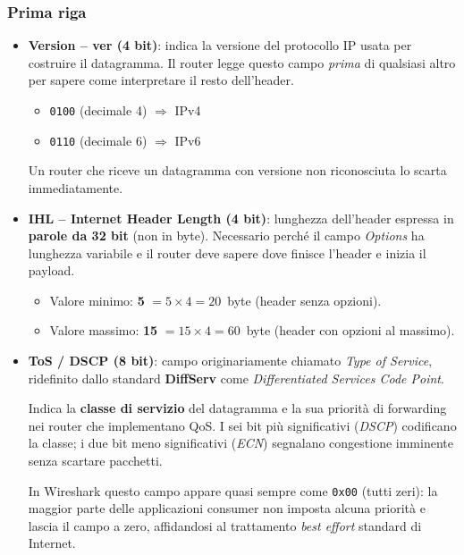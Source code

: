 \documentclass[a4paper,12pt]{report}
\begin{document}
\subsubsection*{Prima riga}
\begin{itemize}

    \item \textbf{Version -- ver (4 bit)}: indica la versione del
          protocollo IP usata per costruire il datagramma. Il router
          legge questo campo \emph{prima} di qualsiasi altro per sapere
          come interpretare il resto dell'header.
          \begin{itemize}
              \item \texttt{0100} (decimale 4) $\Rightarrow$ IPv4
              \item \texttt{0110} (decimale 6) $\Rightarrow$ IPv6
          \end{itemize}
          Un router che riceve un datagramma con versione non riconosciuta
          lo scarta immediatamente.

    \item \textbf{IHL -- Internet Header Length (4 bit)}: lunghezza
          dell'header espressa in \textbf{parole da 32 bit} (non in
          byte). Necessario perché il campo \textit{Options} ha
          lunghezza variabile e il router deve sapere dove finisce
          l'header e inizia il payload.
          \begin{itemize}
              \item Valore minimo: \textbf{5} $= 5 \times 4 = 20$~byte
                    (header senza opzioni).
              \item Valore massimo: \textbf{15} $= 15 \times 4 = 60$~byte
                    (header con opzioni al massimo).
          \end{itemize}

    \item \textbf{ToS / DSCP (8 bit)}: campo originariamente chiamato
          \textit{Type of Service}, ridefinito dallo standard
          \textbf{DiffServ} come \textit{Differentiated Services Code
          Point}. 
          
          Indica la \textbf{classe di servizio} del datagramma
          e la sua priorità di forwarding nei router che implementano
          QoS. I sei bit più significativi (\textit{DSCP}) codificano
          la classe; i due bit meno significativi
          (\textit{ECN}) segnalano congestione imminente senza
          scartare pacchetti.
          \begin{notebox}{}
          In Wireshark questo campo appare quasi sempre come
          \texttt{0x00} (tutti zeri): la maggior parte delle
          applicazioni consumer non imposta alcuna priorità e lascia
          il campo a zero, affidandosi al trattamento \textit{best
          effort} standard di Internet.
          \end{notebox}


\end{itemize}
\end{document}
